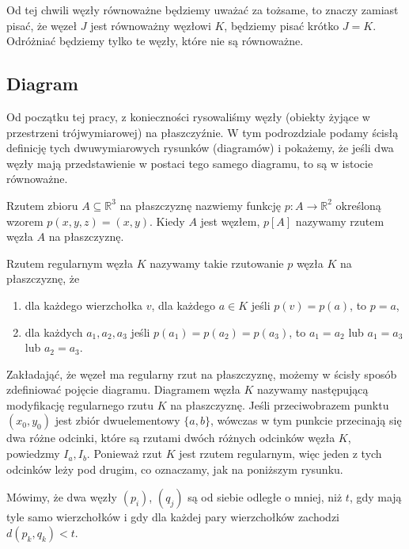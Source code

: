 Od tej chwili węzły równoważne będziemy uważać za tożsame, to znaczy zamiast pisać, że węzeł $J$ jest równoważny węzłowi $K$, będziemy pisać krótko $J=K$.
Odróżniać będziemy tylko te węzły, które nie są równoważne.
 
\subsection{Diagram}
Od początku tej pracy, z konieczności rysowaliśmy węzły (obiekty żyjące w przestrzeni trójwymiarowej) na płaszczyźnie.
W tym podrozdziale podamy ścisłą definicję tych dwuwymiarowych rysunków (diagramów) i pokażemy, że jeśli dwa węzły mają przedstawienie w postaci tego samego diagramu,
to są w istocie równoważne.
 
\begin{definicja}
 Rzutem zbioru $A\subseteq\mathbb{R}^3$ na płaszczyznę nazwiemy funkcję $p\colon A\to\mathbb{R}^2$ określoną wzorem $p(x,y,z) = (x,y)$. Kiedy $A$ jest węzłem, $p[A]$ nazywamy
 rzutem węzła $A$ na płaszczyznę.
\end{definicja}
 
 
\begin{definicja}
\label{rzut_reg}
 Rzutem regularnym węzła $K$ nazywamy takie rzutowanie $p$ węzła $K$ na płaszczyznę, że
 \begin{enumerate}
  \item dla każdego wierzchołka $v$, dla każdego $a\in K$ jeśli $p(v) = p(a)$, to $p=a$,
  \item dla każdych $a_1, a_2, a_3$ jeśli $p(a_1)=p(a_2)=p(a_3)$, to $a_1=a_2$ lub $a_1=a_3$ lub $a_2=a_3$.
 \end{enumerate}
\end{definicja}
 
Zakładająć, że węzeł ma regularny rzut na płaszczyznę, możemy w ścisły sposób zdefiniować pojęcie diagramu.
Diagramem węzła $K$ nazywamy następującą modyfikację regularnego rzutu $K$ na płaszczyznę. Jeśli przeciwobrazem punktu $(x_0, y_0)$ jest zbiór dwuelementowy
$\lbrace a,b\rbrace$, wówczas w tym punkcie przecinają się dwa różne odcinki, które są rzutami dwóch różnych odcinków węzła $K$, powiedzmy $I_a, I_b$.
Ponieważ rzut $K$ jest rzutem regularnym, więc jeden z tych odcinków leży pod drugim, co oznaczamy, jak na poniższym rysunku.
 
\begin{definicja}
 Mówimy, że dwa węzły $(p_i)$, $(q_j)$ są od siebie odległe o mniej, niż $t$, gdy mają tyle samo wierzchołków i gdy dla każdej pary wierzchołków zachodzi $d(p_k,q_k) < t$.
\end{definicja}
 

